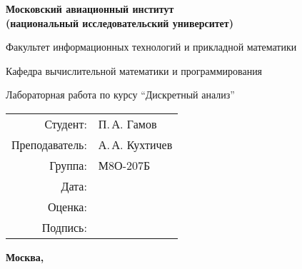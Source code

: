 \begin{titlepage}
\begin{center}
\bfseries
{\Large Московский авиационный институт\\ (национальный исследовательский университет)}

\vspace{48pt}
{\large Факультет информационных технологий и прикладной математики}

\vspace{36pt}
{\large Кафедра вычислительной математики и программирования}

\vspace{48pt}Лабораторная работа  по курсу 
\enquote{Дискретный анализ}
\end{center}
\vspace{72pt}

\begin{flushright}
\begin{tabular}{rl}
Студент: & П.\,А. Гамов \\
Преподаватель: & А.\,А. Кухтичев \\
Группа: & М8О-207Б \\
Дата: & \\
Оценка: & \\
Подпись: & \\
\end{tabular}
\end{flushright}
\vfill
\begin{center}
\bfseries
Москва, \the\year
\end{center}
\end{titlepage}

\pagebreak